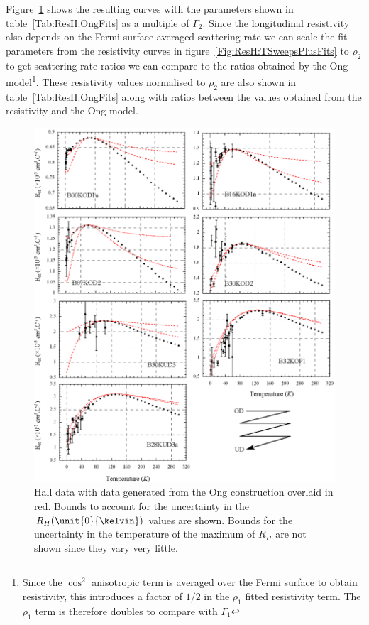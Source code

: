 Figure~\ref{Fig:ResH:OngFits} shows the resulting curves with the parameters shown in table~\ref{Tab:ResH:OngFits} as a multiple of $\Gamma_2$. Since the longitudinal resistivity also depends on the Fermi surface averaged scattering rate we can scale the fit parameters from the resistivity curves in figure~\ref{Fig:ResH:TSweepsPlusFits} to $\rho_2$ to get scattering rate ratios we can compare to the ratios obtained by the Ong model\footnote{Since the $\cos^2$ anisotropic term is averaged over the Fermi surface to obtain resistivity, this introduces a factor of $1/2$ in the $\rho_1$ fitted resistivity term. The $\rho_1$ term is therefore doubles to compare with $\Gamma_1$}. These resistivity values normalised to $\rho_2$ are also shown in table~\ref{Tab:ResH:OngFits} along with ratios between the values obtained from the resistivity and the Ong model.
\begin{figure}[htbp]
    \begin{center}
        \includegraphics[scale=0.9]{Chapter-HallBSCO/Figures/OngFits/OngFits}
        \caption{Hall data with data generated from the Ong construction overlaid in red. Bounds to account for the uncertainty in the $R_H(\unit{0}{\kelvin})$ values are shown. Bounds for the uncertainty in the temperature of the maximum of $R_H$ are not shown since they vary very little.}
        \label{Fig:ResH:OngFits}
    \end{center}
\end{figure}

